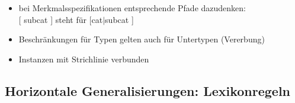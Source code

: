 {%
\vfill

\begin{itemize}[<+->]
\item bei Merkmalsspezifikationen entsprechende Pfade dazudenken:\\
      {}[ {\sc subcat} \liste{}] steht für [{\sc cat$|$subcat} \liste{} ]
\item Beschränkungen für Typen gelten auch für Untertypen (Vererbung)
\item Instanzen mit Strichlinie verbunden
\end{itemize}

}



\subsection{Horizontale Generalisierungen: Lexikonregeln}

